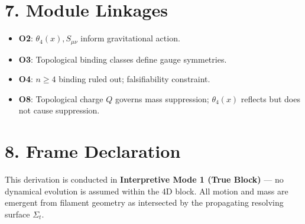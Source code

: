 \documentclass[12pt]{article}
\begin{document}
\section*{7. Module Linkages}

\begin{itemize}
    \item \textbf{O2}: \( \theta_4(x), S_{\mu\nu} \) inform gravitational action.
    \item \textbf{O3}: Topological binding classes define gauge symmetries.
    \item \textbf{O4}: \( n \geq 4 \) binding ruled out; falsifiability constraint.
    \item \textbf{O8}: Topological charge \( Q \) governs mass suppression; \( \theta_4(x) \) reflects but does not cause suppression.
\end{itemize}

\section*{8. Frame Declaration}

This derivation is conducted in \textbf{Interpretive Mode 1 (True Block)} — no dynamical evolution is assumed within the 4D block. All motion and mass are emergent from filament geometry as intersected by the propagating resolving surface \( \Sigma_t \).
\end{document}
